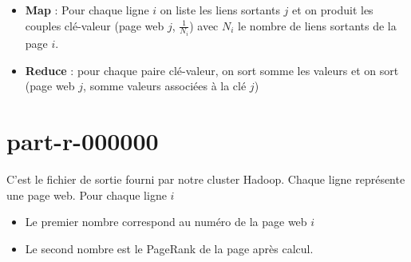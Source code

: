 \documentclass[a4paper,11pt]{article}
\begin{document}
\begin{itemize}
\item \textbf{Map} : Pour chaque ligne $i$ on liste les liens sortants $j$ et on produit les couples clé-valeur (page web $j$, $\frac{1}{N_{i}}$) avec $N_{i}$ le nombre de liens sortants de la page $i$.
\item \textbf{Reduce} : pour chaque paire clé-valeur, on sort somme les valeurs et on sort (page web $j$, somme valeurs associées à la clé $j$)
\end{itemize}

\section{part-r-000000}

C'est le fichier de sortie fourni par notre cluster Hadoop. Chaque ligne représente une page web. Pour chaque ligne $i$
\begin{itemize}
\item Le premier nombre correspond au numéro de la page web $i$
\item Le second nombre est le PageRank de la page après calcul.
\end{itemize}
\end{document}
